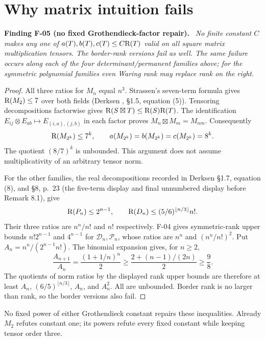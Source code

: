 \documentclass[11pt]{article}
\newenvironment{finding}[2]{\par\medskip\noindent\textbf{Finding #1 (#2).}\ \itshape}{\par\medskip}
\begin{document}
\section{Why matrix intuition fails}
\begin{finding}{F-05}{no fixed Grothendieck-factor repair}
No finite constant $C$ makes any one of $a(T),b(T),c(T)\leq C\mathrm R(T)$
valid on all square matrix multiplication tensors. The border-rank
versions fail as well. The same failure occurs along each of the four
determinant/permanent families above; for the symmetric polynomial
families even Waring rank may replace rank on the right.
\end{finding}
\begin{proof}
All three ratios for $M_n$ equal $n^3$. Strassen's seven-term formula
gives $\mathrm R(M_2)\leq7$ over both fields (Derksen \cite{Der},
\S1.5, equation (5)). Tensoring decompositions factorwise gives
$\mathrm R(S\boxtimes T)\leq\mathrm R(S)\mathrm R(T)$.
The identification
$E_{ij}\otimes E_{ab}\mapsto E_{(i,a),(j,b)}$ in each factor proves
$M_n\boxtimes M_m=M_{nm}$. Consequently
\[
 \mathrm R(M_{2^k})\leq7^k,\qquad
 a(M_{2^k})=b(M_{2^k})=c(M_{2^k})=8^k.
\]
The quotient $(8/7)^k$ is unbounded. This argument does not assume
multiplicativity of an arbitrary tensor norm.

For the other families, the real decompositions recorded in
Derksen \S1.7, equation (8), and \S8, p.~23 (the five-term
display and final unnumbered display before Remark 8.1), give
\[
 \mathrm R(P_n)\leq2^{n-1},\qquad
 \mathrm R(D_n)\leq(5/6)^{\lfloor n/3\rfloor}n!.
\]
Their three ratios are $n^n/n!$ and $n!$ respectively.
F-04 gives symmetric-rank upper bounds $n!2^{n-1}$ and $4^{n-1}$
for $\mathcal D_n,\mathcal P_n$, whose ratios are
$n^n$ and $(n^n/n!)^2$. Put $A_n=n^n/(2^{n-1}n!)$.
The binomial expansion gives, for $n\geq2$,
\[
 \frac{A_{n+1}}{A_n}
 =\frac{(1+1/n)^n}{2}
 \geq\frac{2+(n-1)/(2n)}2\geq\frac98.
\]
The quotients of norm ratios by the displayed rank upper bounds
are therefore at least $A_n$, $(6/5)^{\lfloor n/3\rfloor}$,
$A_n$, and $A_n^2$. All are unbounded.
Border rank is no larger than rank, so the border versions also fail.
\end{proof}
No fixed power of either Grothendieck constant repairs these
inequalities. Already $M_2$ refutes constant one; its powers refute
every fixed constant while keeping tensor order three.
\end{document}
